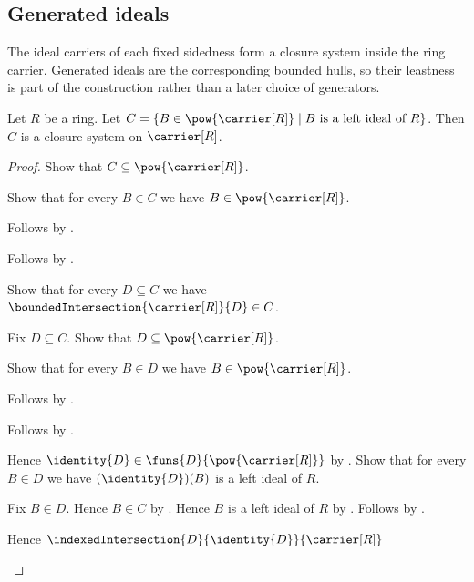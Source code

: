 \subsection{Generated ideals}

The ideal carriers of each fixed sidedness form a closure system inside the
ring carrier.  Generated ideals are the corresponding bounded hulls, so their
leastness is part of the construction rather than a later choice of
generators.

\begin{proposition}\label{left_ideal_carriers_form_closure_system}
    Let $R$ be a ring.
    Let
        $C=\{B\in\pow{\carrier[R]}\mid
            \text{$B$ is a left ideal of $R$}\}$.
    Then $C$ is a closure system on $\carrier[R]$.
\end{proposition}
\begin{proof}
    Show that $C\subseteq\pow{\carrier[R]}$.
    \begin{subproof}
        Show that for every $B\in C$ we have
            $B\in\pow{\carrier[R]}$.
        \begin{subproof}
            Follows by \auto.
        \end{subproof}
        Follows by .
    \end{subproof}
    Show that for every $D\subseteq C$ we have
        $\boundedIntersection{\carrier[R]}{D}\in C$.
    \begin{subproof}
        Fix $D\subseteq C$.
        Show that $D\subseteq\pow{\carrier[R]}$.
        \begin{subproof}
            Show that for every $B\in D$ we have
                $B\in\pow{\carrier[R]}$.
            \begin{subproof}
                Follows by .
            \end{subproof}
            Follows by .
        \end{subproof}
        Hence $\identity{D}\in
            \funs{D}{\pow{\carrier[R]}}$ by
            .
        Show that for every $B\in D$ we have
            $(\identity{D})(B)$ is a left ideal of $R$.
        \begin{subproof}
            Fix $B\in D$.
            Hence $B\in C$ by .
            Hence $B$ is a left ideal of $R$ by \auto.
            Follows by .
        \end{subproof}
        Hence
            $\indexedIntersection{D}{\identity{D}}{\carrier[R]}$

\end{subproof}
\end{proof}
